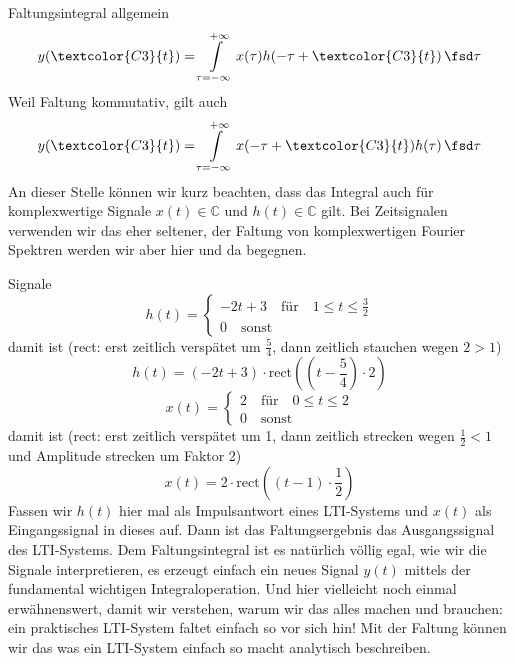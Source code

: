 \begin{Werkzeug}
Faltungsintegral allgemein
\begin{equation}
y(\textcolor{C3}{t}) = \int\limits_{\tau=-\infty}^{+\infty} x(\tau) h(-\tau + \textcolor{C3}{t}) \, \fsd \tau
\end{equation}
Weil Faltung kommutativ, gilt auch
\begin{equation}
y(\textcolor{C3}{t}) = \int\limits_{\tau=-\infty}^{+\infty} x(-\tau+\textcolor{C3}{t}) h(\tau) \, \fsd \tau
\end{equation}
An dieser Stelle können wir kurz beachten, dass das Integral auch für
komplexwertige Signale $x(t)\in\mathbb{C}$ und $h(t)\in\mathbb{C}$ gilt. Bei
Zeitsignalen verwenden wir das eher seltener, der Faltung von komplexwertigen
Fourier Spektren werden wir aber hier und da begegnen.
\end{Werkzeug}

\begin{Ansatz}
Signale
\begin{equation}
h(t) =
\begin{cases}
-2 t + 3 \quad \mathrm{für} \quad 1 \leq t \leq \frac{3}{2}\\
0 \quad \mathrm{sonst}
\end{cases}
\end{equation}
damit ist (rect: erst zeitlich verspätet um $\frac{5}{4}$, dann zeitlich
stauchen wegen $2>1$)
\begin{equation}
h(t) = (-2 t + 3) \cdot \mathrm{rect}\left(\left(t-\frac{5}{4}\right) \cdot 2\right)
\end{equation}
\begin{equation}
x(t)=
\begin{cases}
  2 \quad \mathrm{für} \quad 0 \leq t \leq 2\\
  0 \quad \mathrm{sonst}
\end{cases}
\end{equation}
damit ist (rect: erst zeitlich verspätet um 1, dann zeitlich strecken wegen
$\frac{1}{2}<1$ und Amplitude strecken um Faktor 2)
\begin{equation}
x(t) = 2\cdot\mathrm{rect}\left(\left(t-1\right) \cdot \frac{1}{2}\right)
\end{equation}
Fassen wir $h(t)$ hier mal als Impulsantwort eines LTI-Systems und $x(t)$ als
Eingangssignal in dieses auf.
Dann ist das Faltungsergebnis das Ausgangssignal des LTI-Systems.
Dem Faltungsintegral ist es natürlich völlig egal, wie wir die Signale interpretieren, es erzeugt einfach ein neues Signal $y(t)$ mittels der fundamental wichtigen Integraloperation. Und hier vielleicht noch einmal erwähnenswert, damit wir verstehen, warum wir das alles machen und brauchen: ein praktisches LTI-System faltet einfach so vor sich hin! Mit der Faltung können wir das was ein LTI-System einfach so macht analytisch beschreiben.
%

\end{Ansatz}


